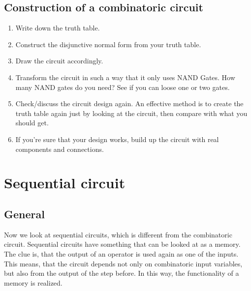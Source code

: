 \subsection{Construction of a combinatoric circuit}
\begin{enumerate}
	\item Write down the truth table.
	\item Construct the disjunctive normal form from your truth table.
	\item Draw the circuit accordingly.
	\item Transform the circuit in such a way that it only uses NAND Gates.
	      How many NAND gates do you need? See if you can loose one or two gates.
	\item Check/discuss the circuit design again. An effective method is to create the truth table again just by looking at the circuit, then compare with what you should get. 
	\item If you're sure that your design works, build up the circuit with real components and connections. 
\end{enumerate}



                                                       
\section{Sequential circuit}                           
\subsection{General}
Now we look at sequential circuits, which is different from the combinatoric circuit. Sequential circuits have something that can be looked at as a memory. The clue is, that the output of an operator is used again as one of the inputs. This means, that the circuit depends not only on combinatoric input variables, but also from the output of the step before. In this way, the functionality of a memory is realized. 

